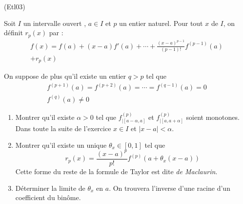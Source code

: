 \begin{tiny}(Etl03)\end{tiny}
Soit $I$ un intervalle ouvert , $a\in I$ et $p$ un entier naturel. Pour tout $x$ de $I$, on définit $r_p(x)$ par :
\begin{multline*}
 f(x) = f(a)+(x-a)f'(a)+\cdots+\frac{(x-a)^{p-1}}{(p-1)!}f^{(p-1)}(a)\\+r_p(x)
\end{multline*}

On suppose de plus qu'il existe un entier $q>p$ tel que
\begin{multline*}
 f^{(p+1)}(a)=f^{(p+2)}(a)=\cdots=f^{(q-1)}(a)=0 \\ f^{(q)}(a)\neq 0
\end{multline*}

\begin{enumerate}
 \item Montrer qu'il existe $\alpha >0$ tel que $f^{(p)}_{|[a-\alpha, a]}$ et $f^{(p)}_{|[a, a +\alpha]}$ soient monotones. Dans toute la suite de l'exercice $x\in I$ et $|x-a|<\alpha$.
\item Montrer qu'il existe un unique $\theta_x\in[0,1]$ tel que
\begin{displaymath}
 r_p(x) = \frac{(x-a)^p}{p!}f^{(p)}(a+\theta_x(x-a))
\end{displaymath}
Cette forme du reste de la formule de Taylor est dite \emph{de Maclaurin}.
\item Déterminer la limite de $\theta_x$ en $a$.\newline
On trouvera l'inverse d'une racine d'un coefficient du binôme. 
\end{enumerate}
